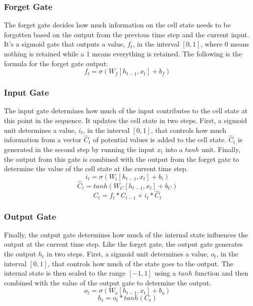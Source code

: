 \subsubsection{Forget Gate}

The forget gate decides how much information on the cell state needs to be forgotten based on the output from the previous time step and the current input. It's a sigmoid gate that outputs a value, $f_t$, in the interval $[0, 1]$, where 0 means nothing is retained while a 1 means everything is retained\cite{LSTM}. The following is the formula for the forget gate output:
\begin{equation}
f_t = \sigma(W_f[h_{t-1}, x_t] + b_f)
\end{equation}

\subsubsection{Input Gate}

The input gate determines how much of the input contributes to the cell state at this point in the sequence. It updates the cell state in two steps. First, a sigmoid unit determines a value, $i_t$, in the interval $[0, 1]$, that controls how much information from a vector $\hat{C}_t$ of potential values is added to the cell state. $\hat{C}_t$ is generated in the second step by running the input $x_t$ into a $tanh$ unit. Finally, the output from this gate is combined with the output from the forget gate to determine the value of the cell state at the current time step\cite{LSTM}.
\begin{equation}
i_t = \sigma(W_i[h_{t-1}, x_t] + b_i)
\end{equation}
\begin{equation}
\hat{C}_t = tanh(W_C[h_{t-1}, x_t] + b_C)
\end{equation}
\begin{equation}
C_t = f_t * C_{t-1} + i_t * \hat{C}_t
\end{equation}

\subsubsection{Output Gate}

Finally, the output gate determines how much of the internal state influences the output at the current time step. Like the forget gate, the output gate generates the output $h_t$ in two steps. First, a sigmoid unit determines a value, $o_t$, in the interval $[0, 1]$, that controls how much of the state goes to the output. The internal state is then scaled to the range $[-1, 1]$ using a $tanh$ function and then combined with the value of the output gate to determine the output\cite{LSTM}.
\begin{equation}
o_t = \sigma(W_o[h_{t-1}, x_t] + b_o)
\end{equation}
\begin{equation}
h_t = o_t * tanh(C_t)
\end{equation}